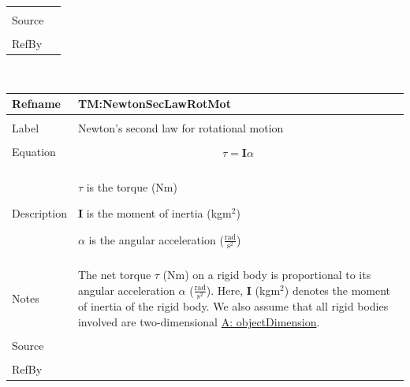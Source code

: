 \documentclass[12pt]{article}
\begin{document}
\begin{minipage}{\textwidth}
\begin{tabular}{p{} p{}}
                                         \\ \midrule \\
                                         Source & \\ \midrule \\
                                                  RefBy & 
\\ \bottomrule \end{tabular}
\end{minipage}
\par~

\noindent \begin{minipage}{\textwidth}
\begin{tabular}{p{} p{}}
\toprule \textbf{Refname} & \textbf{TM:NewtonSecLawRotMot}
\label{TM:NewtonSecLawRotMot}
\\ \midrule \\
Label & Newton's second law for rotational motion
        \\ \midrule \\
        Equation & \begin{displaymath}
                   τ=\mathbf{I} α
                   \end{displaymath}
                   \\ \midrule \\
                   Description & \begin{symbDescription}
                                 \item{$τ$ is the torque (Nm)}
                                 \item{$\mathbf{I}$ is the moment of inertia (kg$\text{m}^{2}$)}
                                 \item{$α$ is the angular acceleration ($\frac{\text{rad}}{\text{s}^{2}}$)}
                                 \end{symbDescription}
                                 \\ \midrule \\
                                 Notes & The net torque $τ$ (Nm) on a rigid body is proportional to its angular acceleration $α$ ($\frac{\text{rad}}{\text{s}^{2}}$). Here, $\mathbf{I}$ (kg$\text{m}^{2}$) denotes the moment of inertia of the rigid body. We also assume that all rigid bodies involved are two-dimensional \hyperref[assumpOD]{A: objectDimension}.
                                         \\ \midrule \\
                                         Source & \\ \midrule \\
                                                  RefBy & 
\\ \bottomrule \end{tabular}
\end{minipage}
\end{document}
